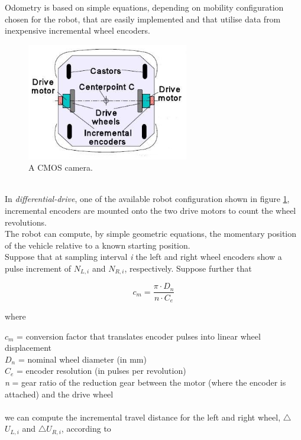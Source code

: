 Odometry is based on simple equations, depending on mobility configuration
chosen for the robot, that are easily implemented and that utilise
data from inexpensive incremental wheel encoders.
\begin{figure} [h]
  \begin{center}
    \includegraphics[width=200pt]{img/differential_drive.jpg}
    \caption{A CMOS camera.}
    \label{fig:differential_drive}
  \end{center}
\end{figure}
\\
In \textit{differential-drive}, one of the available robot configuration
shown in figure \ref{fig:differential_drive}, incremental encoders
are mounted onto the two
drive motors to count the wheel revolutions.
\\
The robot can compute, by simple geometric equations, the momentary
position of the vehicle relative to a known starting position.
\\
Suppose that at sampling interval \textit{i} the left and right wheel
encoders show a pulse increment of \textit{$N_{L,i}$} and \textit{$N_{R,i}$},
respectively. Suppose further that

\[
c_m = \frac{\pi \cdot D_n } {n \cdot C_e }
\]

where

\textit{$c_m$} = conversion factor that translates encoder pulses into
linear wheel displacement \\
\textit{$D_n$} = nominal wheel diameter (in mm) \\
\textit{$C_e$} = encoder resolution (in pulses per revolution) \\
\textit{n}   = gear ratio of the reduction gear between the motor
(where the encoder is attached) and the drive wheel \\
\\
we can compute the incremental travel distance for the left and
right wheel, $\bigtriangleup$$U_{L,i}$ and $\bigtriangleup$$U_{R,i}$,
according to

